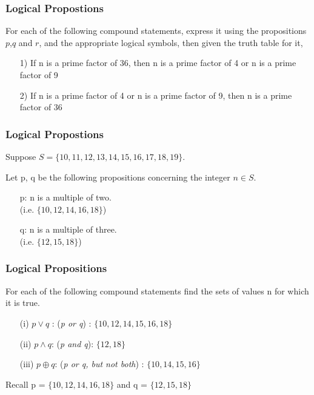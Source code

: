 \documentclass{beamer}
\begin{document}
\begin{frame}

\frametitle{Logical Propostions}
\Large
For each of the following compound statements, express it using the propositions $p$,$q$ and $r$, and the appropriate logical symbols, then given the truth table for it,

\begin{itemize}
\item[1)] If n is a prime factor of 36, then n is a prime factor of 4 or n is a prime factor of 9
\item[2)] If n is a prime factor of 4 or n is a prime factor of 9, then  n is a prime factor of 36
\end{itemize}
\end{frame}
\begin{frame}
\frametitle{Logical Propostions}
\Large
Suppose $S = \{10,11,12,13,14,15,16,17,18,19\}$.
\vspace{0.3cm}

Let p, q be the following propositions concerning the integer $n \in S$.
\vspace{0.3cm}
\begin{itemize}
\item[p:] n is a multiple of two. \\(i.e. $\{10,12,14,16,18\}$)
\vspace{0.3cm}
\item[q:] n is a multiple of three. \\(i.e. $\{12,15,18\}$)
\end{itemize}
\end{frame}
\begin{frame}
\frametitle{Logical Propositions}
\Large
For each of the following compound statements find the sets of values n for which it is true. 
\vspace{0.4cm}
\begin{itemize}
\item[(i)] $p \vee q$ : (\textit{p or q}) :  $\{10, 12, 14, 15, 16, 18\}$ 
\vspace{0.5cm}
\item[(ii)] $p \wedge q$: (\textit{p and q}):  $\{12, 18\}$
\vspace{0.5cm}
\item[(iii)] $ p \oplus q$: (\textit{p or q, but not both}) :  $\{10, 14, 15, 16\}$
\end{itemize}
\vspace{0.7cm}
\large
Recall p = $\{10,12,14,16,18\}$  and q = $\{12,15,18\}$
\end{frame}
\end{document}
